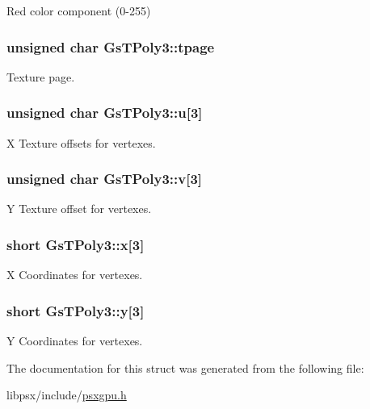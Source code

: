 Red color component (0-\/255) 

\hypertarget{structGsTPoly3_a12e862df67b142de177d776c29272e67}{}
\subsubsection[{tpage}]{\setlength{\rightskip}{0pt plus 5cm}unsigned char Gs\+T\+Poly3\+::tpage}\label{structGsTPoly3_a12e862df67b142de177d776c29272e67}


Texture page. 

\hypertarget{structGsTPoly3_abe4334142f3a9953479fd82cc9962c27}{}
\subsubsection[{u}]{\setlength{\rightskip}{0pt plus 5cm}unsigned char Gs\+T\+Poly3\+::u\mbox{[}3\mbox{]}}\label{structGsTPoly3_abe4334142f3a9953479fd82cc9962c27}


X Texture offsets for vertexes. 

\hypertarget{structGsTPoly3_a0542f91621ad1a3ad58c57529edbc9ae}{}
\subsubsection[{v}]{\setlength{\rightskip}{0pt plus 5cm}unsigned char Gs\+T\+Poly3\+::v\mbox{[}3\mbox{]}}\label{structGsTPoly3_a0542f91621ad1a3ad58c57529edbc9ae}


Y Texture offset for vertexes. 

\hypertarget{structGsTPoly3_ace20bf105754c114fbc0edd4f6da6f39}{}
\subsubsection[{x}]{\setlength{\rightskip}{0pt plus 5cm}short Gs\+T\+Poly3\+::x\mbox{[}3\mbox{]}}\label{structGsTPoly3_ace20bf105754c114fbc0edd4f6da6f39}


X Coordinates for vertexes. 

\hypertarget{structGsTPoly3_a224a67e5dbe4fddc7a638979a8a6501e}{}
\subsubsection[{y}]{\setlength{\rightskip}{0pt plus 5cm}short Gs\+T\+Poly3\+::y\mbox{[}3\mbox{]}}\label{structGsTPoly3_a224a67e5dbe4fddc7a638979a8a6501e}


Y Coordinates for vertexes. 



The documentation for this struct was generated from the following file\+:\begin{DoxyCompactItemize}
\item 
libpsx/include/\hyperlink{psxgpu_8h}{psxgpu.\+h}\end{DoxyCompactItemize}
